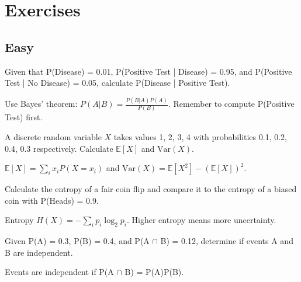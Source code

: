 
\section*{Exercises}

\subsection*{Easy}

\begin{exercisebox}[easy]
\begin{problem}
Given that P(Disease) = 0.01, P(Positive Test | Disease) = 0.95, and P(Positive Test | No Disease) = 0.05, calculate P(Disease | Positive Test).
\end{problem}
\begin{hintbox}
Use Bayes' theorem: $P(A|B) = \frac{P(B|A)P(A)}{P(B)}$. Remember to compute P(Positive Test) first.
\end{hintbox}
\end{exercisebox}


\begin{exercisebox}[easy]
\begin{problem}
A discrete random variable $X$ takes values 1, 2, 3, 4 with probabilities 0.1, 0.2, 0.4, 0.3 respectively. Calculate $\mathbb{E}[X]$ and $\text{Var}(X)$.
\end{problem}
\begin{hintbox}
$\mathbb{E}[X] = \sum_i x_i P(X=x_i)$ and $\text{Var}(X) = \mathbb{E}[X^2] - (\mathbb{E}[X])^2$.
\end{hintbox}
\end{exercisebox}


\begin{exercisebox}[easy]
\begin{problem}
Calculate the entropy of a fair coin flip and compare it to the entropy of a biased coin with P(Heads) = 0.9.
\end{problem}
\begin{hintbox}
Entropy $H(X) = -\sum_i p_i \log_2 p_i$. Higher entropy means more uncertainty.
\end{hintbox}
\end{exercisebox}


\begin{exercisebox}[easy]
\begin{problem}
Given P(A) = 0.3, P(B) = 0.4, and P(A $\cap$ B) = 0.12, determine if events A and B are independent.
\end{problem}
\begin{hintbox}
Events are independent if P(A $\cap$ B) = P(A)P(B).
\end{hintbox}
\end{exercisebox}


